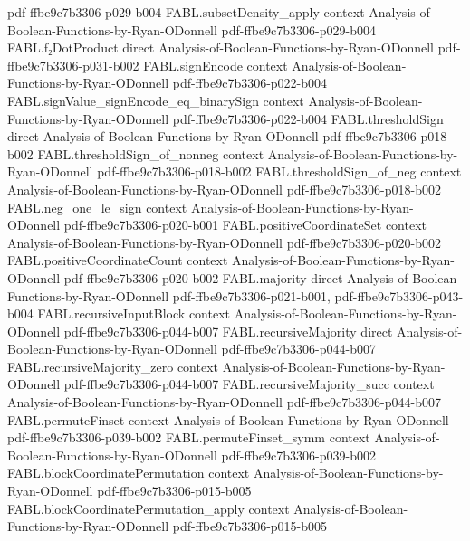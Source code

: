 \begin{theorem}
  {pdf-ffbe9c7b3306-p029-b004}
\proofstep
  {FABL.subsetDensity_apply}
  {context}
  {Analysis-of-Boolean-Functions-by-Ryan-ODonnell}
  {pdf-ffbe9c7b3306-p029-b004}
\proofstep
  {FABL.f₂DotProduct}
  {direct}
  {Analysis-of-Boolean-Functions-by-Ryan-ODonnell}
  {pdf-ffbe9c7b3306-p031-b002}
\proofstep
  {FABL.signEncode}
  {context}
  {Analysis-of-Boolean-Functions-by-Ryan-ODonnell}
  {pdf-ffbe9c7b3306-p022-b004}
\proofstep
  {FABL.signValue_signEncode_eq_binarySign}
  {context}
  {Analysis-of-Boolean-Functions-by-Ryan-ODonnell}
  {pdf-ffbe9c7b3306-p022-b004}
\proofstep
  {FABL.thresholdSign}
  {direct}
  {Analysis-of-Boolean-Functions-by-Ryan-ODonnell}
  {pdf-ffbe9c7b3306-p018-b002}
\proofstep
  {FABL.thresholdSign_of_nonneg}
  {context}
  {Analysis-of-Boolean-Functions-by-Ryan-ODonnell}
  {pdf-ffbe9c7b3306-p018-b002}
\proofstep
  {FABL.thresholdSign_of_neg}
  {context}
  {Analysis-of-Boolean-Functions-by-Ryan-ODonnell}
  {pdf-ffbe9c7b3306-p018-b002}
\proofstep
  {FABL.neg_one_le_sign}
  {context}
  {Analysis-of-Boolean-Functions-by-Ryan-ODonnell}
  {pdf-ffbe9c7b3306-p020-b001}
\proofstep
  {FABL.positiveCoordinateSet}
  {context}
  {Analysis-of-Boolean-Functions-by-Ryan-ODonnell}
  {pdf-ffbe9c7b3306-p020-b002}
\proofstep
  {FABL.positiveCoordinateCount}
  {context}
  {Analysis-of-Boolean-Functions-by-Ryan-ODonnell}
  {pdf-ffbe9c7b3306-p020-b002}
\proofstep
  {FABL.majority}
  {direct}
  {Analysis-of-Boolean-Functions-by-Ryan-ODonnell}
  {pdf-ffbe9c7b3306-p021-b001,
    pdf-ffbe9c7b3306-p043-b004}
\proofstep
  {FABL.recursiveInputBlock}
  {context}
  {Analysis-of-Boolean-Functions-by-Ryan-ODonnell}
  {pdf-ffbe9c7b3306-p044-b007}
\proofstep
  {FABL.recursiveMajority}
  {direct}
  {Analysis-of-Boolean-Functions-by-Ryan-ODonnell}
  {pdf-ffbe9c7b3306-p044-b007}
\proofstep
  {FABL.recursiveMajority_zero}
  {context}
  {Analysis-of-Boolean-Functions-by-Ryan-ODonnell}
  {pdf-ffbe9c7b3306-p044-b007}
\proofstep
  {FABL.recursiveMajority_succ}
  {context}
  {Analysis-of-Boolean-Functions-by-Ryan-ODonnell}
  {pdf-ffbe9c7b3306-p044-b007}
\proofstep
  {FABL.permuteFinset}
  {context}
  {Analysis-of-Boolean-Functions-by-Ryan-ODonnell}
  {pdf-ffbe9c7b3306-p039-b002}
\proofstep
  {FABL.permuteFinset_symm}
  {context}
  {Analysis-of-Boolean-Functions-by-Ryan-ODonnell}
  {pdf-ffbe9c7b3306-p039-b002}
\proofstep
  {FABL.blockCoordinatePermutation}
  {context}
  {Analysis-of-Boolean-Functions-by-Ryan-ODonnell}
  {pdf-ffbe9c7b3306-p015-b005}
\proofstep
  {FABL.blockCoordinatePermutation_apply}
  {context}
  {Analysis-of-Boolean-Functions-by-Ryan-ODonnell}
  {pdf-ffbe9c7b3306-p015-b005}

\end{theorem}
